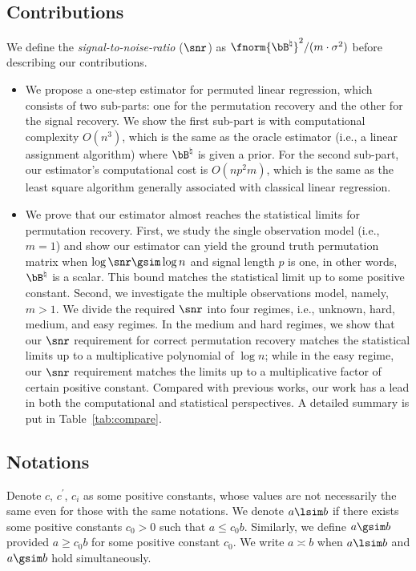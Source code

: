 \documentclass[11pt]{article}
\def \bBtrue {\bB^{\natural}}
\begin{document}
\subsection{Contributions}
We define the \emph{signal-to-noise-ratio} ($\snr$)
as $\fnorm{\bBtrue}^2/(m\cdot \sigma^2)$
before describing our contributions.
\begin{itemize}
\item
We propose a one-step estimator for permuted linear regression, which consists of two sub-parts:
one for the permutation recovery and the other
for the signal recovery. We show the first sub-part is
with computational complexity $O(n^3)$, which is the
same as the oracle estimator (i.e., a linear assignment algorithm) where $\bBtrue$ is given a prior. For the second sub-part, our estimator's computational cost is
$O(np^2 m)$, which is the same as the least square algorithm generally associated with classical linear regression.

\item
We prove that our estimator almost reaches the
statistical limits for permutation recovery.
First, we study the single observation model (i.e., $m=1$) and show
our estimator can yield the ground truth permutation
matrix when
$\log \snr \gsim \log n$ and signal length $p$ is one, in other words, $\bBtrue$ is a scalar.
This bound matches the statistical limit up to some
positive constant.
Second, we investigate the multiple observations model, namely, $m > 1$. We divide the required
$\snr$ into four regimes, i.e., unknown, hard, medium, and easy regimes. In the medium and hard regimes, we show that our $\snr$ requirement for correct permutation recovery matches the
statistical limits up to a multiplicative
polynomial of $\log n$; while in the
easy regime, our $\snr$ requirement matches
the limits up to a multiplicative factor of
certain positive constant. Compared with
previous works, our work has a lead in both
the computational and statistical perspectives.
A detailed summary is put in Table~\ref{tab:compare}.
\end{itemize}

\newpage

\subsection{Notations}

Denote $c$, $c^{'}$, $c_i$ as some positive constants,
whose values are not necessarily the same even
for those with the same notations.
We denote $a\lsim b$ if there exists
some positive constants $c_0 > 0$ such that
$a\leq c_0 b$. Similarly, we define
$a\gsim b$ provided $a\geq c_0 b$ for
some positive constant $c_0$.
We write $a\asymp b$ when
$a\lsim b$ and $a\gsim b$ hold simultaneously.
\end{document}
